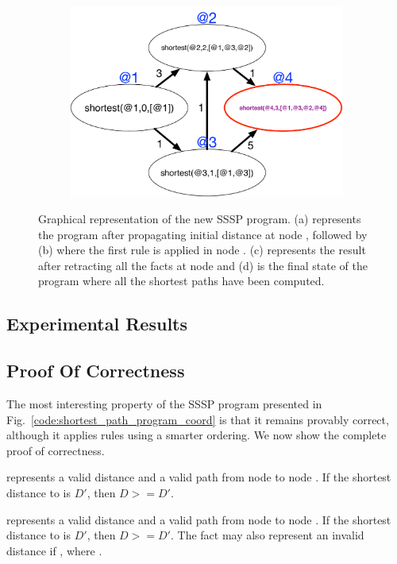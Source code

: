 \begin{figure}
\begin{center}
\begin{subfigure}[b]{0.4\textwidth}
      \caption{}
   \end{subfigure}
   \begin{subfigure}[b]{0.4\textwidth}
      \includegraphics[width=\textwidth]{figures/sssp/coord4}
      \caption{}
   \end{subfigure}
\end{center}
\caption{Graphical representation of the new SSSP program. (a) represents the
   program after propagating initial distance at node , followed by
   (b) where the first rule is applied in node . (c)
   represents the result after retracting all the  facts at node
    and (d) is the final state of the program where all the shortest paths
   have been computed.}
\label{fig:coordination:new_sssp}
\end{figure}

\subsection{Experimental Results}

\subsection{Proof Of Correctness}

The most interesting property of the SSSP program presented in
Fig.~\ref{code:shortest_path_program_coord} is that it remains provably correct,
although it applies rules using a smarter ordering. We now show the complete
proof of correctness.

\begin{invariant}[Distance]

 represents a valid distance  and a valid path
 from node  to node . If the shortest distance to
 is $D'$, then $D >= D'$.

 represents a valid distance  and a valid
path  from node  to node . If the shortest
distance to  is $D'$, then $D >= D'$. The  fact may
also represent an invalid distance if , where .

\end{invariant}

